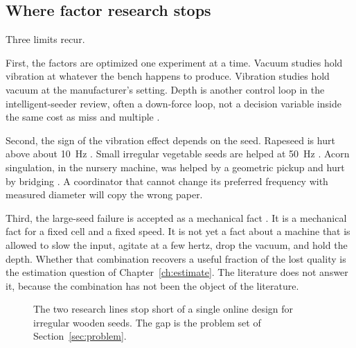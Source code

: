 \subsection{Where factor research stops}

Three limits recur.

First, the factors are optimized one experiment at a time. Vacuum studies hold vibration at whatever the bench happens to produce. Vibration studies hold vacuum at the manufacturer's setting. Depth is another control loop in the intelligent-seeder review, often a down-force loop, not a decision variable inside the same cost as miss and multiple \cite{liu2025review}.

Second, the sign of the vibration effect depends on the seed. Rapeseed is hurt above about 10~Hz \cite{zhang2024vib}. Small irregular vegetable seeds are helped at 50~Hz \cite{li2025drum}. Acorn singulation, in the nursery machine, was helped by a geometric pickup and hurt by bridging \cite{dinkel1991}. A coordinator that cannot change its preferred frequency with measured diameter will copy the wrong paper.

Third, the large-seed failure is accepted as a mechanical fact \cite{wells1990}. It is a mechanical fact for a fixed cell and a fixed speed. It is not yet a fact about a machine that is allowed to slow the input, agitate at a few hertz, drop the vacuum, and hold the depth. Whether that combination recovers a useful fraction of the lost quality is the estimation question of Chapter~\ref{ch:estimate}. The literature does not answer it, because the combination has not been the object of the literature.

\begin{figure}[htbp]
\centering
{}
\caption{The two research lines stop short of a single online design for irregular wooden seeds. The gap is the problem set of Section~\ref{sec:problem}.}
\label{fig:gap}
\end{figure}

